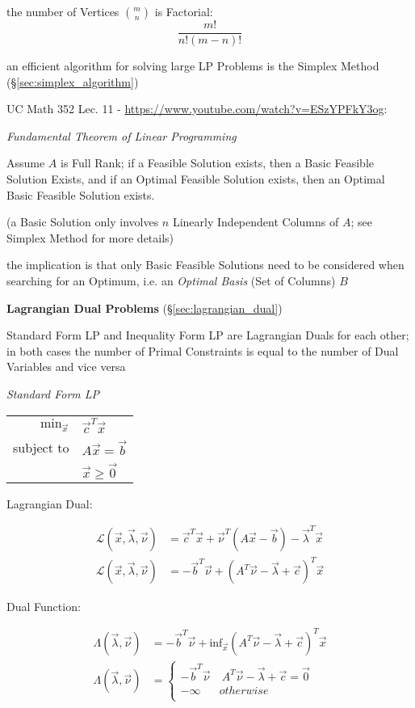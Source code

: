 the number of Vertices $\binom{m}{n}$ is Factorial:
\[
  \frac{m!}{n!(m-n)!}
\]

an efficient algorithm for solving large LP Problems is the Simplex Method
(\S\ref{sec:simplex_algorithm})


UC Math 352 Lec. 11 - \url{https://www.youtube.com/watch?v=ESzYPFkY3og}:


\emph{Fundamental Theorem of Linear Programming}

Assume $A$ is Full Rank; if a Feasible Solution exists, then a Basic Feasible
Solution Exists, and if an Optimal Feasible Solution exists, then an Optimal
Basic Feasible Solution exists.

(a Basic Solution only involves $n$ Linearly Independent Columns of $A$; see
Simplex Method for more details)

the implication is that only Basic Feasible Solutions need to be considered
when searching for an Optimum, i.e. an \emph{Optimal Basis} (Set of Columns)
$B$


\textbf{Lagrangian Dual Problems} (\S\ref{sec:lagrangian_dual})

Standard Form LP and Inequality Form LP are Lagrangian Duals for each other; in
both cases the number of Primal Constraints is equal to the number of Dual
Variables and vice versa

\emph{Standard Form LP}

\begin{tabular}{r l}
  $\mathrm{min}_{\vec{x}}$ & $\vec{c}^T\vec{x}$     \\
  subject to               & $A\vec{x} = \vec{b}$   \\
                           & $\vec{x} \geq \vec{0}$ \\
\end{tabular}

Lagrangian Dual:

\begin{align*}
  \mathcal{L}(\vec{x},\vec{\lambda},\vec{\nu}) & =
    \vec{c}^T\vec{x} + \vec{\nu}^T(A\vec{x} - \vec{b}) - \vec{\lambda}^T\vec{x} \\
  \mathcal{L}(\vec{x},\vec{\lambda},\vec{\nu}) & =
    -\vec{b}^T\vec{\nu} + (A^T\vec{\nu} - \vec{\lambda} + \vec{c})^T\vec{x}
\end{align*}

Dual Function:

\begin{align*}
  \Lambda(\vec{\lambda},\vec{\nu}) & = -\vec{b}^T\vec{\nu} +
    \mathrm{inf}_{\vec{x}}(A^T\vec{\nu} - \vec{\lambda} + \vec{c})^T\vec{x} \\
  \Lambda(\vec{\lambda},\vec{\nu}) & = \begin{cases}
    -\vec{b}^T\vec{\nu} & \ A^T\vec{\nu} - \vec{\lambda} + \vec{c} = \vec{0} \\
    -\infty             & otherwise \\
  \end{cases}
\end{align*}

